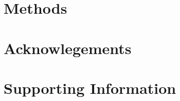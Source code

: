\section{Methods}
{\footnotesize

}

\section{Acknowlegements}





\onecolumngrid

\pagebreak
\FloatBarrier

\beginsupplement
\setcounter{secnumdepth}{4}
\section{Supporting Information}


\pagebreak


\pagebreak





